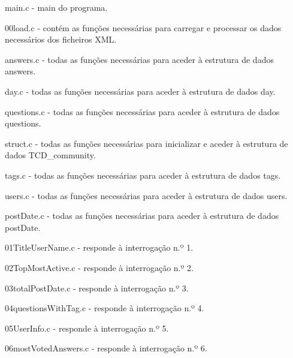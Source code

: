 \documentclass[a4paper]{article}
\begin{document}
\begin{itemize}
\begin{item} main.c - main do programa.\end{item}
\begin{item} 00load.c - contém as funções necessárias para carregar e processar os
dados necessários dos ficheiros XML.\end{item}
\begin{item} answers.c - todas as funções necessárias para aceder à estrutura de
dados answers.\end{item}
\begin{item} day.c - todas as funções necessárias para aceder à estrutura de
dados day.\end{item}
\begin{item} questions.c - todas as funções necessárias para aceder à estrutura de
dados questions.\end{item}
\begin{item} struct.c - todas as funções necessárias para inicializar e aceder à
estrutura de dados TCD\_community.\end{item}
\begin{item} tags.c - todas as funções necessárias para aceder à estrutura de
dados tags.\end{item}
\begin{item} users.c - todas as funções necessárias para aceder à estrutura de
dados users.\end{item}
\begin{item} postDate.c - todas as funções necessárias para aceder à estrutura de
dados postDate.\end{item}
\begin{item} 01TitleUserName.c - responde à interrogação n.º 1.\end{item}
\begin{item} 02TopMostActive.c - responde à interrogação n.º 2.\end{item}
\begin{item} 03totalPostDate.c - responde à interrogação n.º 3.\end{item}
\begin{item} 04questionsWithTag.c - responde à interrogação n.º 4.\end{item}
\begin{item} 05UserInfo.c - responde à interrogação n.º 5.\end{item}
\begin{item} 06mostVotedAnswers.c - responde à interrogação n.º 6.\end{item}

\end{itemize}
\end{document}
